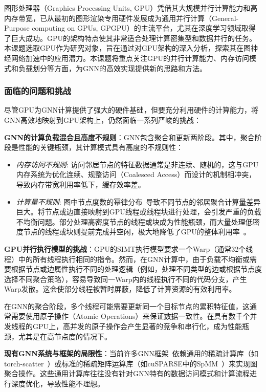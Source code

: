 图形处理器（Graphics Processing Units, GPU）凭借其大规模并行计算能力和高内存带宽，已从最初的图形渲染专用硬件发展成为通用并行计算（General-Purpose computing on GPUs, GPGPU）的主流平台，尤其在深度学习领域取得了巨大成功。GPU的架构特点使其非常适合处理计算密集型和数据并行的任务。本课题选取GPU作为研究对象，旨在通过对GPU架构的深入分析，探索其在图神经网络加速中的应用潜力。本课题将重点关注GPU的并行计算能力、内存访问模式和负载划分等方面，为GNN的高效实现提供新的思路和方法。

\subsubsection{面临的问题和挑战}
尽管GPU为GNN计算提供了强大的硬件基础，但要充分利用硬件的计算能力，将GNN高效地映射到GPU架构上，仍然面临一系列严峻的挑战：

\textbf{GNN的计算负载混合且高度不规则}：GNN包含聚合和更新两阶段。其中，聚合阶段是性能的关键瓶颈，其计算模式具有高度的不规则性：
\begin{itemize}
    \item \textit{内存访问不规则}: 访问邻居节点的特征数据通常是非连续、随机的，这与GPU内存系统为优化连续、规整访问（Coalesced Access）而设计的机制相冲突，导致内存带宽利用率低下，缓存效率差。
    \item \textit{计算量不规则}: 图中节点度数的幂律分布~\cite{graph-power-law}导致不同节点的邻居聚合计算量差异巨大。将节点或边直接映射到GPU线程或线程块进行处理，会引发严重的负载不均衡问题。部分处理高密度节点的线程或块成为性能瓶颈，而大量处理低密度节点的线程或块则提前完成并空闲，极大地降低了GPU的整体利用率~\cite{han2014experimental}。
\end{itemize}

\textbf{GPU并行执行模型的挑战}：GPU的SIMT执行模型要求一个Warp（通常32个线程）中的所有线程执行相同的指令。然而，在GNN计算中，由于负载不均衡或需要根据节点或边属性执行不同的处理逻辑（例如，处理不同类型的边或根据节点度选择不同聚合策略），容易导致同一Warp内的线程执行不同的代码分支，产生Warp发散。这会使部分线程被暂时屏蔽，降低了计算资源的有效利用率。

在GNN的聚合阶段，多个线程可能需要更新同一个目标节点的累积特征值，这通常需要使用原子操作（Atomic Operations）来保证数据一致性。在具有数千个并发线程的GPU上，高并发的原子操作会产生显著的竞争和串行化，成为性能瓶颈，尤其是在高节点度的情况下。

\textbf{现有GNN系统与框架的局限性}：当前许多GNN框架~\cite{pyG,wang2019dgl}依赖通用的稀疏计算库（如torch-scatter~\cite{torch-scatter}）或标准的稀疏矩阵运算库（如cuSPARSE中的SpMM~\cite{cusparse}）来实现图聚合操作。这些通用计算库往往没有针对GNN特有的数据访问模式和计算流程进行深度优化，导致性能不理想。

